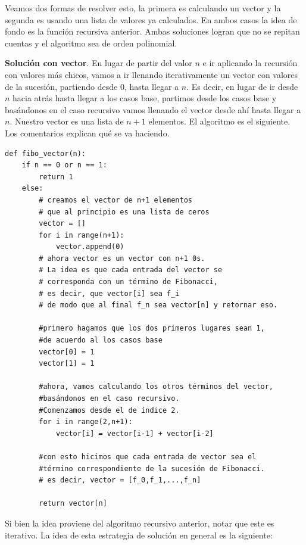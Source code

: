 \documentclass[a4paper, 12pt]{report}
\theoremstyle{definition}
\begin{document}
Veamos dos formas de resolver esto, la primera es calculando un vector y la segunda es usando una lista de valores ya calculados. En ambos casos la idea de fondo es la función recursiva anterior. Ambas soluciones logran que no se repitan cuentas y el algoritmo sea de orden polinomial.

{\bf Solución con vector}. En lugar de partir del valor $n$ e ir aplicando la recursión con valores más chicos, vamos a ir llenando iterativamente un vector con valores de la sucesión, partiendo desde $0$, hasta llegar a $n$. Es decir, en lugar de ir desde $n$ hacia atrás hasta llegar a los casos base, partimos desde los casos base y basándonos en el caso recursivo vamos llenando el vector desde ahí hasta llegar a $n$. Nuestro vector es una lista de $n+1$ elementos. El algoritmo es el siguiente. Los comentarios explican qué se va haciendo.
\begin{verbatim}
def fibo_vector(n):
    if n == 0 or n == 1:
        return 1
    else:
        # creamos el vector de n+1 elementos
        # que al principio es una lista de ceros
        vector = []
        for i in range(n+1):
            vector.append(0)
        # ahora vector es un vector con n+1 0s.
        # La idea es que cada entrada del vector se
        # corresponda con un término de Fibonacci,
        # es decir, que vector[i] sea f_i
        # de modo que al final f_n sea vector[n] y retornar eso.
        
        #primero hagamos que los dos primeros lugares sean 1,
        #de acuerdo al los casos base
        vector[0] = 1
        vector[1] = 1
        
        #ahora, vamos calculando los otros términos del vector,
        #basándonos en el caso recursivo.
        #Comenzamos desde el de índice 2.
        for i in range(2,n+1):
            vector[i] = vector[i-1] + vector[i-2]
        
        #con esto hicimos que cada entrada de vector sea el
        #término correspondiente de la sucesión de Fibonacci.
        # es decir, vector = [f_0,f_1,...,f_n]
        
        return vector[n]
\end{verbatim}
Si bien la idea proviene del algoritmo recursivo anterior, notar que este es iterativo. La idea de esta estrategia de solución en general es la siguiente:
\end{document}
